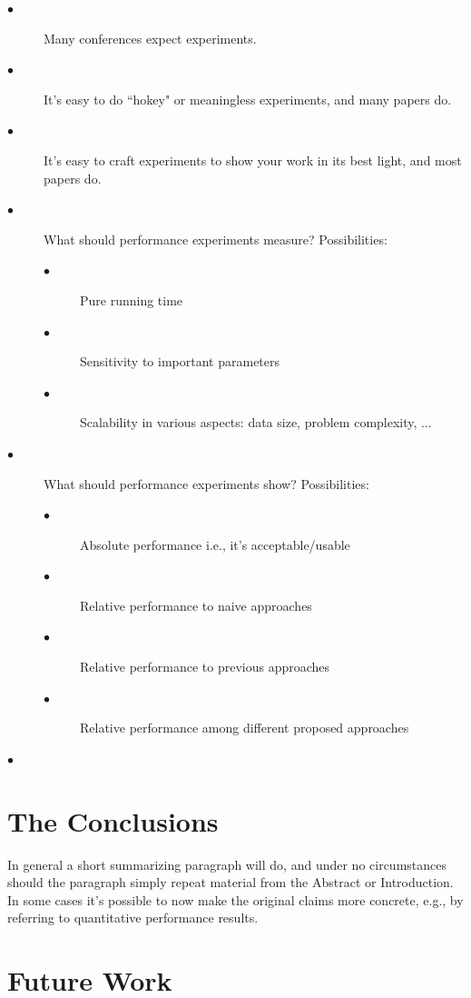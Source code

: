 \documentclass[10pt,twocolumn]{article}
\begin{document}
\begin{description}
  \item[$\bullet$]  Many conferences expect experiments.
  \item[$\bullet$]  It's easy to do ``hokey" or meaningless experiments, and many papers do.
  \item[$\bullet$]  It's easy to craft experiments to show your work in its best light, and most papers do.
    \item[$\bullet$]  What should performance experiments measure? Possibilities:  
    \begin{description}
  	  \item[$\bullet$] Pure running time
      \item[$\bullet$] Sensitivity to important parameters
      \item[$\bullet$] Scalability in various aspects: data size, problem complexity, ...
  \end{description}
    \item[$\bullet$]  What should performance experiments show? Possibilities:
        \begin{description}
  	  \item[$\bullet$] Absolute performance i.e., it's acceptable/usable
      \item[$\bullet$] Relative performance to naive approaches
      \item[$\bullet$] Relative performance to previous approaches
      \item[$\bullet$] Relative performance among different proposed approaches
  \end{description}
  \item[$\bullet$] 
\end{description}


\section{The Conclusions}

In general a short summarizing paragraph will do, and under no circumstances should the paragraph simply repeat material from the Abstract or Introduction. In some cases it's possible to now make the original claims more concrete, e.g., by referring to quantitative performance results.

\section{Future Work}
\end{document}
